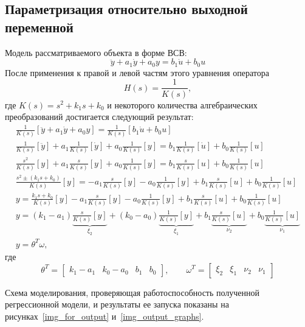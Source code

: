 \subsection{Параметризация относительно выходной переменной}
Модель рассматриваемого объекта в форме ВСВ:
\begin{equation}
    \ddot{y} + a_1 \dot{y} + a_0 y = b_1 \dot{u} + b_0 u
\end{equation}
После применения к правой и левой частям этого уравнения оператора
\begin{equation}
    H(s) = \frac{1}{K(s)},
\end{equation}
где $K(s) = s^2 + k_1 s + k_0$ и некоторого количества алгебраических преобразований достигается следующий результат:
\begin{gather}
    \frac{1}{K(s)}[\ddot{y} + a_1 \dot{y} + a_0 y] = \frac{1}{K(s)}[b_1 \dot{u} + b_0 u] \\
    \frac{1}{K(s)}[\ddot{y}] + a_1 \frac{1}{K(s)}[\dot{y}] + a_0\frac{1}{K(s)}[y] = b_1 \frac{1}{K(s)}[\dot{u}] + b_0\frac{1}{K(s)}[u] \\
    \frac{s^2}{K(s)}[y] + a_1 \frac{s}{K(s)}[y] + a_0\frac{1}{K(s)}[y] = b_1 \frac{s}{K(s)}[u] + b_0\frac{1}{K(s)}[u] \\
    \frac{s^2 \pm (k_1 s + k_0)}{K(s)}[y] = -a_1 \frac{s}{K(s)}[y] - a_0\frac{1}{K(s)}[y] + b_1 \frac{s}{K(s)}[u] + b_0\frac{1}{K(s)}[u] \\
    y = \frac{k_1 s + k_0}{K(s)}[y] -a_1 \frac{s}{K(s)}[y] - a_0\frac{1}{K(s)}[y] + b_1 \frac{s}{K(s)}[u] + b_0\frac{1}{K(s)}[u] \\
    y = (k_1 - a_1) \underbrace{\frac{s}{K(s)}[y]}_{\xi_2} + (k_0 - a_0) \underbrace{\frac{1}{K(s)}[y]}_{\xi_1} + b_1 \underbrace{\frac{s}{K(s)}[u]}_{\nu_2} + b_0 \underbrace{\frac{1}{K(s)}[u]}_{\nu_1} \\
    y = \theta^T \omega,
\end{gather}
где
\begin{equation}
    \theta^T =
    \begin{bmatrix}
        k_1 - a_1 & k_0 - a_0 & b_1 & b_0
    \end{bmatrix}\!\!,
    \qquad
    \omega^T =
    \begin{bmatrix}
        \xi_2 & \xi_1 & \nu_2 & \nu_1
    \end{bmatrix}
\end{equation}

Схема моделирования, проверяющая работоспособность полученной регрессионной модели, и результаты ее запуска показаны на рисунках~\ref{img_for_output} и~\ref{img_output_graphs}.

